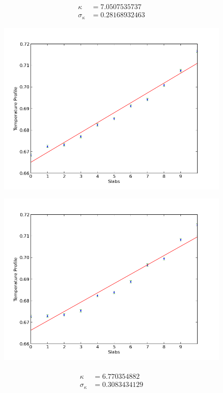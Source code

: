 \documentclass[12pt,a4paper]{article}
\begin{document}
\begin{align*}
 \kappa &= 7.0507535737 \\
 \sigma_\kappa&=0.28168932463
\end{align*}
\begin{figure}[h]
  \includegraphics[width=\linewidth]{2.png}
\end{figure}
\begin{figure}[h]
  \includegraphics[width=\linewidth]{3.png}
\end{figure}
\paragraph{}
\begin{align*}
\kappa &=6.770354882  \\
\sigma_\kappa &=0.3083434129
\end{align*}

	
	
\end{document}

